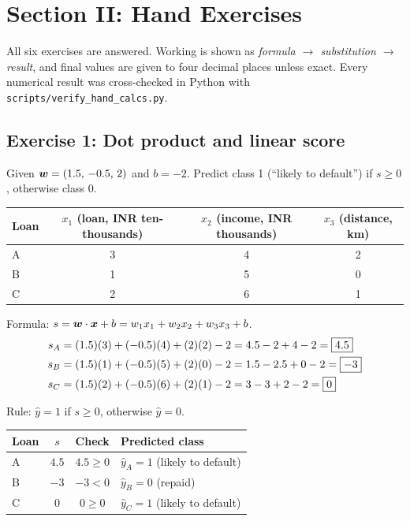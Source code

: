 \section{Section II: Hand Exercises}
\label{sec:two}

\noindent All six exercises are answered. Working is shown as \emph{formula $\to$ substitution $\to$ result},
and final values are given to four decimal places unless exact. Every numerical result was
cross-checked in Python with \texttt{scripts/verify\_hand\_calcs.py}.

\subsection{Exercise 1: Dot product and linear score}
Given $\bm{w} = (1.5,\,-0.5,\,2)$ and $b=-2$. Predict class 1 (``likely to default'') if $s\geq 0$, otherwise class 0.

\begin{table}[H]\centering\small
\begin{tabular}{lccc}\toprule
Loan & $x_1$ (loan, INR ten-thousands) & $x_2$ (income, INR thousands) & $x_3$ (distance, km)\\\midrule
A & 3 & 4 & 2\\ B & 1 & 5 & 0\\ C & 2 & 6 & 1\\\bottomrule
\end{tabular}\end{table}

Formula: $s = \bm{w}\cdot\bm{x} + b = w_1x_1 + w_2x_2 + w_3x_3 + b$.
\begin{align*}
s_A &= (1.5)(3) + (-0.5)(4) + (2)(2) - 2 = 4.5 - 2 + 4 - 2 = \boxed{4.5}\\
s_B &= (1.5)(1) + (-0.5)(5) + (2)(0) - 2 = 1.5 - 2.5 + 0 - 2 = \boxed{-3}\\
s_C &= (1.5)(2) + (-0.5)(6) + (2)(1) - 2 = 3 - 3 + 2 - 2 = \boxed{0}
\end{align*}

Rule: $\hat y = 1$ if $s \geq 0$, otherwise $\hat y = 0$.

\begin{table}[H]\centering\small
\begin{tabular}{lccl}\toprule
Loan & $s$ & Check & Predicted class\\\midrule
A & $4.5$ & $4.5 \geq 0$ & $\hat y_A = 1$ (likely to default)\\
B & $-3$ & $-3 < 0$ & $\hat y_B = 0$ (repaid)\\
C & $0$ & $0 \geq 0$ & $\hat y_C = 1$ (likely to default)\\\bottomrule
\end{tabular}\end{table}

